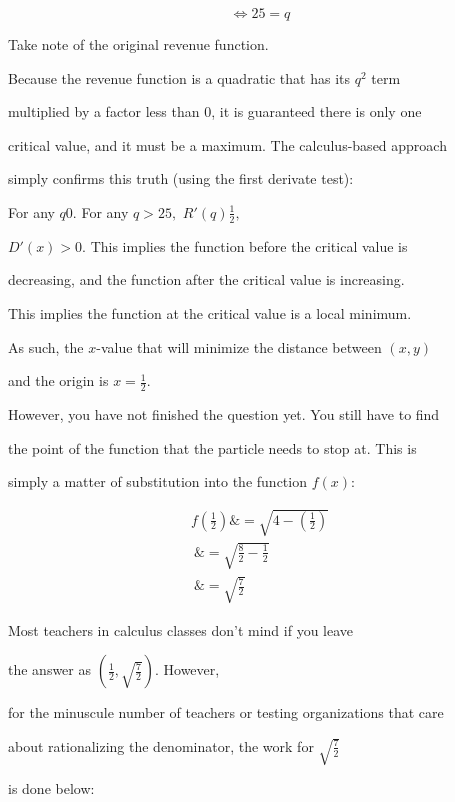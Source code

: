 $$\Leftrightarrow25=q$$



Take note of the original revenue function.

Because the revenue function is a quadratic that has its $q^{2}$ term

multiplied by a factor less than 0, it is guaranteed there is only one

critical value, and it must be a maximum. The calculus-based approach

simply confirms this truth (using the first derivate test):



For any $q0.$ For any $q>25,$ $R'(q)\frac{1}{2},$

    $D'(x)>0.$ This implies the function before the critical value is

    decreasing, and the function after the critical value is increasing.

    This implies the function at the critical value is a local minimum.



As such, the $x$-value that will minimize the distance between $(x,y)$

and the origin is $x=\frac{1}{2}.$



However, you have not finished the question yet. You still have to find

the point of the function that the particle needs to stop at. This is

simply a matter of substitution into the function $f(x)$:



\begin{align}
 f\left(\frac{1}{2}\right)\&=\sqrt{4-\left(\frac{1}{2}\right)} \\\ \&=\sqrt{\frac{8}{2}-\frac{1}{2}} \\\ \&=\sqrt{\frac{7}{2}}
\end{align}



Most teachers in calculus classes don't mind if you leave

the answer as $\left(\frac{1}{2},\sqrt{\frac{7}{2}}\right).$ However,

for the minuscule number of teachers or testing organizations that care

about rationalizing the denominator, the work for $\sqrt{\frac{7}{2}}$

is done below:



